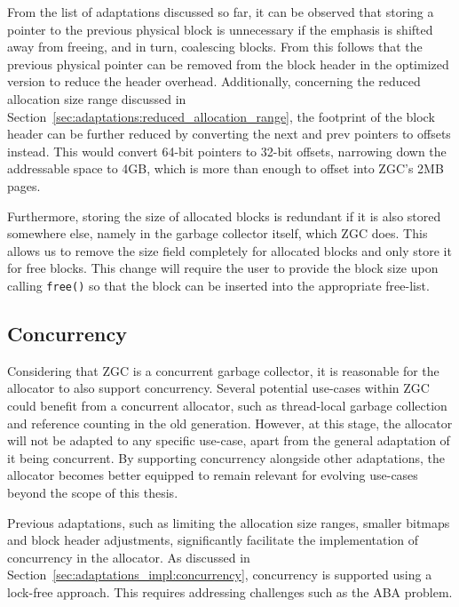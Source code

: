 From the list of adaptations discussed so far, it can be observed that storing a pointer to the previous physical block is unnecessary if the emphasis is shifted away from freeing, and in turn, coalescing blocks. From this follows that the previous physical pointer can be removed from the block header in the optimized version to reduce the header overhead. Additionally, concerning the reduced allocation size range discussed in Section~\ref{sec:adaptations:reduced_allocation_range}, the footprint of the block header can be further reduced by converting the next and prev pointers to offsets instead. This would convert 64-bit pointers to 32-bit offsets, narrowing down the addressable space to 4GB, which is more than enough to offset into ZGC's 2MB pages.

Furthermore, storing the size of allocated blocks is redundant if it is also stored somewhere else, namely in the garbage collector itself, which ZGC does. This allows us to remove the size field completely for allocated blocks and only store it for free blocks. This change will require the user to provide the block size upon calling \texttt{free()} so that the block can be inserted into the appropriate free-list.

\subsection{Concurrency}

Considering that ZGC is a concurrent garbage collector, it is reasonable for the allocator to also support concurrency. Several potential use-cases within ZGC could benefit from a concurrent allocator, such as thread-local garbage collection and reference counting in the old generation. However, at this stage, the allocator will not be adapted to any specific use-case, apart from the general adaptation of it being concurrent. By supporting concurrency alongside other adaptations, the allocator becomes better equipped to remain relevant for evolving use-cases beyond the scope of this thesis.

Previous adaptations, such as limiting the allocation size ranges, smaller bitmaps and block header adjustments, significantly facilitate the implementation of concurrency in the allocator. As discussed in Section~\ref{sec:adaptations_impl:concurrency}, concurrency is supported using a lock-free approach. This requires addressing challenges such as the ABA problem.

